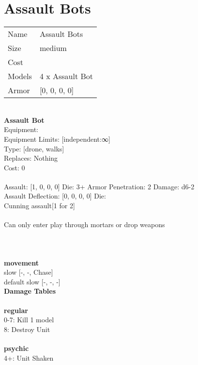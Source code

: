 \pagebreak\pagebreak

\section{ Assault Bots }

\begin{tabular}{ll}
  Name & Assault Bots \\
  Size & medium\\
  Cost & \\
  Models & 4 x Assault Bot\\
  Armor & [0, 0, 0, 0]\\
\end{tabular}

\noindent \\ 


{\bf Assault Bot } \\
Equipment:  \\
Equipment Limits: [independent:∞] \\
Type: [drone, walks] \\
Replaces: Nothing \\
Cost: 0\\
\ \\
Assault: [1, 0, 0, 0] Die: 3+ Armor Penetration: 2 Damage: d6-2 \\
Assault Deflection: [0, 0, 0, 0] Die: \\
\indent Cunning assault[1 for 2]\\ 
 
\ \\
Can only enter play through mortars or drop weapons\\ 

\ \\
 
\ \\



\ \\ {\bf movement } \\
slow [-, -, Chase] \\
default slow [-, -, -] \\


{\bf Damage Tables} \\
\ \\ {\bf regular } \\
0-7: Kill 1 model \\
8: Destroy Unit \\
\ \\ {\bf psychic } \\
4+: Unit Shaken \\











